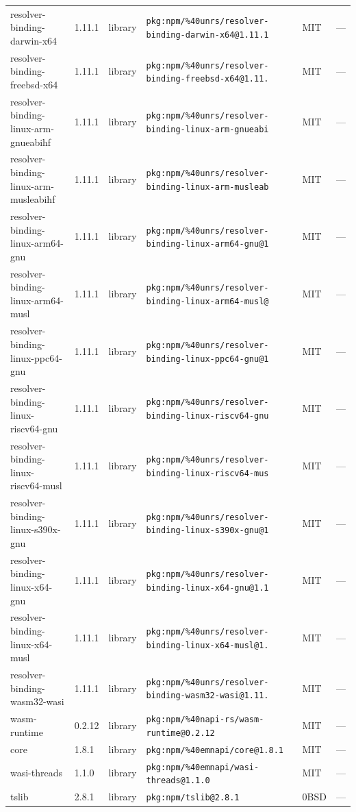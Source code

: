 \documentclass[11pt]{article}
\begin{document}
\begin{longtable}{|l|l|l|p{2.2cm}|l|p{4cm}|}
resolver-binding-darwin-x64 & 1.11.1 & library & \texttt{pkg:npm/\%40unrs/resolver-binding-darwin-x64@1.11.1} & MIT & — \\
resolver-binding-freebsd-x64 & 1.11.1 & library & \texttt{pkg:npm/\%40unrs/resolver-binding-freebsd-x64@1.11.} & MIT & — \\
resolver-binding-linux-arm-gnueabihf & 1.11.1 & library & \texttt{pkg:npm/\%40unrs/resolver-binding-linux-arm-gnueabi} & MIT & — \\
resolver-binding-linux-arm-musleabihf & 1.11.1 & library & \texttt{pkg:npm/\%40unrs/resolver-binding-linux-arm-musleab} & MIT & — \\
resolver-binding-linux-arm64-gnu & 1.11.1 & library & \texttt{pkg:npm/\%40unrs/resolver-binding-linux-arm64-gnu@1} & MIT & — \\
resolver-binding-linux-arm64-musl & 1.11.1 & library & \texttt{pkg:npm/\%40unrs/resolver-binding-linux-arm64-musl@} & MIT & — \\
resolver-binding-linux-ppc64-gnu & 1.11.1 & library & \texttt{pkg:npm/\%40unrs/resolver-binding-linux-ppc64-gnu@1} & MIT & — \\
resolver-binding-linux-riscv64-gnu & 1.11.1 & library & \texttt{pkg:npm/\%40unrs/resolver-binding-linux-riscv64-gnu} & MIT & — \\
resolver-binding-linux-riscv64-musl & 1.11.1 & library & \texttt{pkg:npm/\%40unrs/resolver-binding-linux-riscv64-mus} & MIT & — \\
resolver-binding-linux-s390x-gnu & 1.11.1 & library & \texttt{pkg:npm/\%40unrs/resolver-binding-linux-s390x-gnu@1} & MIT & — \\
resolver-binding-linux-x64-gnu & 1.11.1 & library & \texttt{pkg:npm/\%40unrs/resolver-binding-linux-x64-gnu@1.1} & MIT & — \\
resolver-binding-linux-x64-musl & 1.11.1 & library & \texttt{pkg:npm/\%40unrs/resolver-binding-linux-x64-musl@1.} & MIT & — \\
resolver-binding-wasm32-wasi & 1.11.1 & library & \texttt{pkg:npm/\%40unrs/resolver-binding-wasm32-wasi@1.11.} & MIT & — \\
wasm-runtime & 0.2.12 & library & \texttt{pkg:npm/\%40napi-rs/wasm-runtime@0.2.12} & MIT & — \\
core & 1.8.1 & library & \texttt{pkg:npm/\%40emnapi/core@1.8.1} & MIT & — \\
wasi-threads & 1.1.0 & library & \texttt{pkg:npm/\%40emnapi/wasi-threads@1.1.0} & MIT & — \\
tslib & 2.8.1 & library & \texttt{pkg:npm/tslib@2.8.1} & 0BSD & — \\

\end{longtable}
\end{document}
